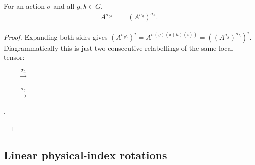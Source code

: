 \begin{lemma}\label{lem:perm_twisted_mul}
    \leanok
    For an action $\sigma$ and all $g, h \in G$,
    \begin{align}
        A^{\sigma_{gh}} & = (A^{\sigma_g})^{\sigma_h}.
        \label{eq:symmetry_perm_composition}
    \end{align}
\end{lemma}

\begin{proof}\leanok{}
    Expanding both sides gives
    $(A^{\sigma_{gh}})^i
        = A^{\sigma(g)(\sigma(h)(i))}
        = ((A^{\sigma_g})^{\sigma_h})^i$.
    Diagrammatically this is just two consecutive relabellings of the same
    local tensor:
    \begin{tenkzequation}
        \tenkzkernel
        \begin{tenkz}[cols=1, boundary=open]
        \end{tenkz}
        \(\qquad \xrightarrow{\sigma_h} \qquad\)
        \begin{tenkz}[cols=1, boundary=open]
        \end{tenkz}
        \(\qquad \xrightarrow{\sigma_g} \qquad\)
        \begin{tenkz}[cols=1, boundary=open]
        \end{tenkz}.
    \end{tenkzequation}
\end{proof}



\subsection{Linear physical-index rotations}

